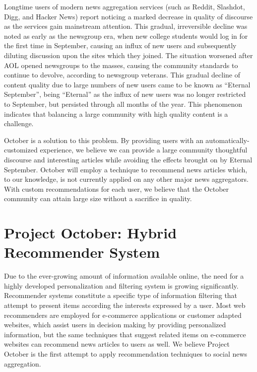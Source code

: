 \documentclass[11pt,letterpaper]{article}
\begin{document}
Longtime users of modern news aggregation services (such as Reddit, Slashdot, Digg, and Hacker News) report noticing a marked decrease in quality of discourse as the services gain mainstream attention.
This gradual, irreversible decline was noted as early as the newsgroup era, when new college students would log in for the first time in September, causing an influx of new users and subsequently diluting discussion upon the sites which they joined.
The situation worsened after AOL opened newsgroups to the masses, causing the community standards to continue to devolve, according to newsgroup veterans\cite{september}.
This gradual decline of content quality due to large numbers of new users came to be known as ``Eternal September'', being ``Eternal'' as the influx of new users was no longer restricted to September, but persisted through all months of the year. 
This phenomenon indicates that balancing a large community with high quality content is a challenge.

October is a solution to this problem.
By providing users with an automatically-customized experience, we believe we can provide a large community thoughtful discourse and interesting articles while avoiding the effects brought on by Eternal September.
October will employ a technique to recommend news articles which, to our knowledge, is not currently applied on any other major news aggregators.
With custom recommendations for each user, we believe that the October  community can attain large size without a sacrifice in quality.

\newpage


\section{Project October: Hybrid Recommender System}

Due to the ever-growing amount of information available online, the need for a highly developed personalization and filtering system is growing significantly.
Recommender systems constitute a specific type of information filtering that
attempt to present items according the interests expressed by a user.
Most web recommenders are employed for e-commerce applications or customer
adapted websites, which assist users in decision making by providing
personalized information, but the same techniques that
suggest related items on e-commerce websites can recommend news articles to users as well.
We believe Project October is the first attempt to apply recommendation techniques to social news aggregation.
\end{document}
